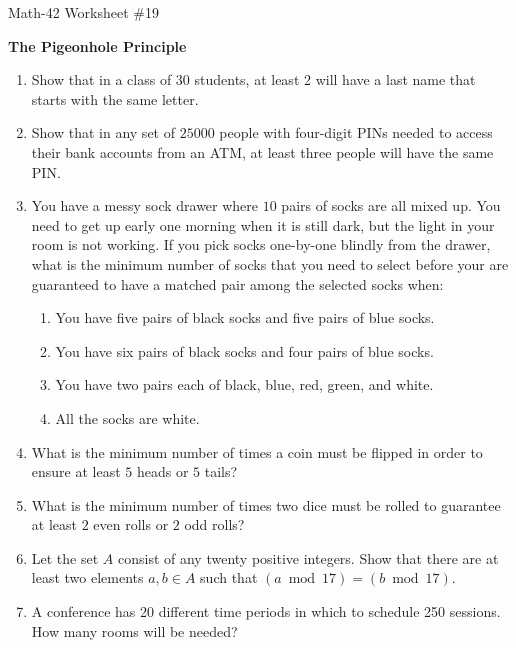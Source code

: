 \documentclass[letterpaper,12pt,fleqn]{article}
\begin{document}
\begin{center}
  \large Math-42 Worksheet \#19

  \textbf{The Pigeonhole Principle}
\end{center}

\vspace{0.5in}

\begin{enumerate}[left=0in,itemsep=0.5in]
\item Show that in a class of 30 students, at least 2 will have a last name that starts with the same letter.

\item Show that in any set of \(25000\) people with four-digit PINs needed to access their bank accounts from an
  ATM, at least three people will have the same PIN.
  
\item You have a messy sock drawer where \(10\) pairs of socks are all mixed up.  You need to get up early one
  morning when it is still dark, but the light in your room is not working.  If you pick socks one-by-one blindly
  from the drawer, what is the minimum number of socks that you need to select before your are guaranteed to have
  a matched pair among the selected socks when:
  \begin{enumerate}
  \item You have five pairs of black socks and five pairs of blue socks.
  \item You have six pairs of black socks and four pairs of blue socks.
  \item You have two pairs each of black, blue, red, green, and white.
  \item All the socks are white.
  \end{enumerate}

\item What is the minimum number of times a coin must be flipped in order to ensure at least \(5\) heads or
  \(5\) tails?

\item What is the minimum number of times two dice must be rolled to guarantee at least \(2\) even rolls or
  \(2\) odd rolls?

\item Let the set \(A\) consist of any twenty positive integers.  Show that there are at least two elements
  \(a,b\in A\) such that \((a\bmod17)=(b\bmod17)\).

\item A conference has 20 different time periods in which to schedule 250 sessions.  How many rooms will be
  needed?


\end{enumerate}
\end{document}
